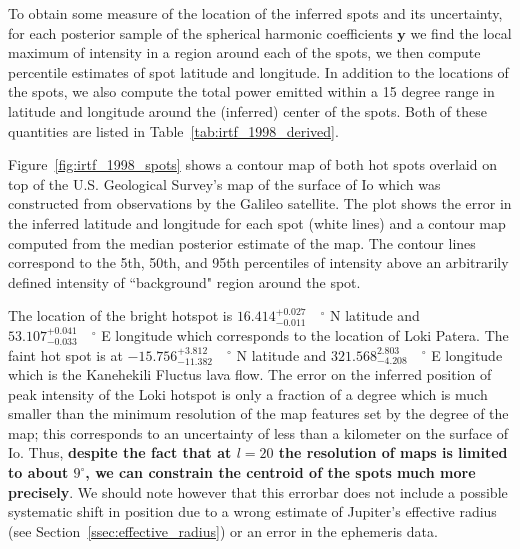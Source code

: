 \documentclass[modern]{aastex62}
\begin{document}
To obtain some measure of the location of the inferred spots and its uncertainty, for each posterior sample of the spherical harmonic coefficients $\mathbf{y}$ we find the local maximum of intensity in a region around each of the spots, we then compute percentile estimates of spot latitude and longitude.
In addition to the locations of the spots, we also compute the total power emitted within a 15 degree range in latitude and longitude around the (inferred) center of the spots.
Both of these quantities are listed in Table~\ref{tab:irtf_1998_derived}. 

Figure~\ref{fig:irtf_1998_spots} shows  a contour map of both hot spots overlaid on top of the U.S. Geological Survey's map of the surface of Io \citep{williams2011} which was constructed from observations by the Galileo satellite.
The plot shows the error in the inferred latitude and longitude for each spot (white lines) and a contour map computed from the median posterior estimate of the map.
The contour lines correspond to the 5th, 50th, and 95th percentiles of intensity above an arbitrarily defined intensity of ``background" region around the spot.

The location of the bright hotspot is $16.414_{-0.011}^{+0.027}\quad^\circ$ N latitude and $53.107_{-0.033}^{+0.041}\quad^\circ$ E longitude which corresponds to the location of Loki Patera.
The faint hot spot is at $-15.756_{-11.382}^{+3.812}\quad ^\circ$ N latitude and $321.568_{-4.208}^{2.803}\quad^\circ$ E longitude which is the Kanehekili Fluctus lava flow.
The error on the inferred position of peak intensity of the Loki hotspot is only a fraction of a degree which is much smaller than the minimum resolution of the map features set by the degree of the map; this corresponds to an uncertainty of less than a kilometer on the surface of Io.
Thus, \textbf{despite the fact that at $l=20$ the resolution of maps is limited to about $9^\circ$, we can constrain the centroid of the spots much more precisely}.
We should note however that this errorbar does not include a possible systematic shift in position due to a wrong estimate of Jupiter's effective radius (see Section~\ref{ssec:effective_radius}) or an error in the ephemeris data.
\end{document}
